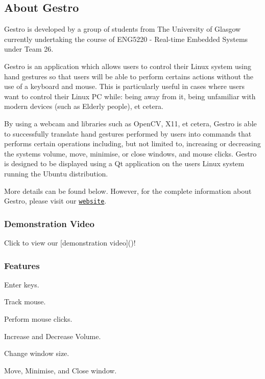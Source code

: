 \subsection*{About Gestro}

Gestro is developed by a group of students from The University of Glasgow currently undertaking the course of E\+N\+G5220 -\/ Real-\/time Embedded Systems under Team 26.

Gestro is an application which allows users to control their Linux system using hand gestures so that users will be able to perform certains actions without the use of a keyboard and mouse. This is particularly useful in cases where users want to control their Linux PC while\+: being away from it, being unfamiliar with modern devices (such as Elderly people), et cetera.

By using a webcam and libraries such as Open\+CV, X11, et cetera, Gestro is able to successfully translate hand gestures performed by users into commands that performs certain operations including, but not limited to, increasing or decreasing the system\textquotesingle{}s volume, move, minimise, or close windows, and mouse clicks. Gestro is designed to be displayed using a Qt application on the users\textquotesingle{} Linux system running the Ubuntu distribution.

More details can be found below. However, for the complete information about Gestro, please visit our \href{https://randomguy-coder.github.io/Gestro/}{\tt website}.

\subsubsection*{Demonstration Video}

Click to view our \mbox{[}demonstration video\mbox{]}()!

  

\subsubsection*{Features}


\begin{DoxyItemize}
\item Enter keys.
\item Track mouse.
\item Perform mouse clicks.
\item Increase and Decrease Volume.
\item Change window size.
\item Move, Minimise, and Close window.
\end{DoxyItemize}


